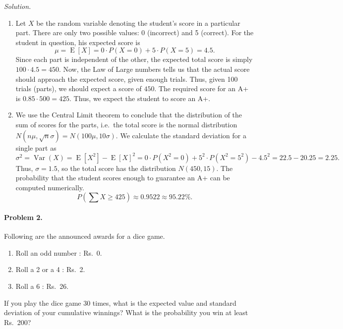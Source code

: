 \documentclass[10pt]{article}
\newcommand\var[1]{\operatorname{Var}(#1)}
\newcommand\E[1]{\operatorname{E}[#1]}
\begin{document}
        \textit{Solution.}
        \begin{enumerate}
                \item Let $X$ be the random variable denoting the student's score in a particular part. There are only two possible values:
                0 (incorrect) and 5 (correct). For the student in question, his expected score is
                \[
                        \mu = \E{X} = 0\cdot P(X = 0) + 5\cdot P(X = 5) = 4.5.
                \]
                Since each part is independent of the other, the expected total score is simply $100 \cdot 4.5 = 450$.
                Now, the Law of Large numbers tells us that the actual score should approach the expected score, given enough trials. Thus,
                given 100 trials (parts), we should expect a score of $450$. The required score for an A+ is $0.85\cdot 500 = 425$.
                Thus, we expect the student to score an A+.

                \item We use the Central Limit theorem to conclude that the distribution of the sum of scores for the parts, i.e.\ the
                total score is the normal distribution $N(n\mu, \sqrt{n}\sigma) = N(100\mu, 10\sigma)$.
                We calculate the standard deviation for a single part as
                \[
                        \sigma^2 = \var{X} = \E{X^2} - \E{X}^2 = 0\cdot P(X^2 = 0) + 5^2\cdot P(X^2 = 5^2) - 4.5^2 = 22.5 - 20.25 = 2.25.
                \]
                Thus, $\sigma = 1.5$, so the total score has the distribution $N(450, 15)$.
                The probability that the student scores enough to guarantee an A+ can be computed numerically.
                \[
                        P\left(\sum X \geq 425\right) \approx 0.9522 \approx 95.22 \%.
                \]
        \end{enumerate}

        \paragraph{Problem 2.} Following are the announced awards for a dice game.
        \begin{enumerate}
                \item Roll an odd number : Rs.\ 0.
                \item Roll a 2 or a 4 : Rs.\ 2.
                \item Roll a 6 : Rs.\ 26.
        \end{enumerate}
        If you play the dice game 30 times, what is the expected value and standard deviation of your cumulative winnings?
        What is the probability you win at least Rs.\ 200? \\
\end{document}
